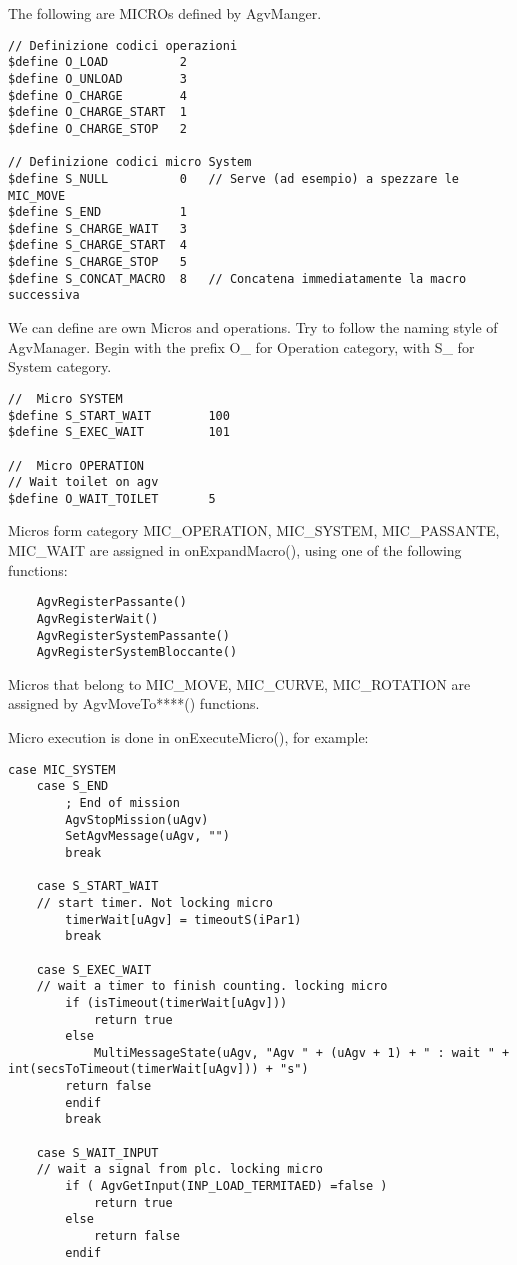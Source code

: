 The following are MICROs defined by AgvManger.

\begin{lstlisting}[caption= MICRO and OPERAIONS defined by AgvManager]
// Definizione codici operazioni
$define O_LOAD          2
$define O_UNLOAD        3
$define O_CHARGE        4
$define O_CHARGE_START  1
$define O_CHARGE_STOP   2

// Definizione codici micro System
$define S_NULL          0	// Serve (ad esempio) a spezzare le MIC_MOVE
$define S_END           1
$define S_CHARGE_WAIT   3
$define S_CHARGE_START  4
$define S_CHARGE_STOP   5
$define S_CONCAT_MACRO  8	// Concatena immediatamente la macro successiva
\end{lstlisting}

We can define are own Micros and operations. Try to follow the naming style of AgvManager. Begin with the prefix O\_ for Operation category, with S\_ for System category.

\begin{lstlisting}[caption= MICRO and OPERAIONS defined by user]
//	Micro SYSTEM
$define S_START_WAIT		100
$define S_EXEC_WAIT			101

//	Micro OPERATION
// Wait toilet on agv
$define O_WAIT_TOILET		5
\end{lstlisting}

Micros form category MIC\_OPERATION, MIC\_SYSTEM, MIC\_PASSANTE, MIC\_WAIT are assigned in onExpandMacro(), using one of the following functions:
\begin{lstlisting}
	AgvRegisterPassante()
	AgvRegisterWait()
	AgvRegisterSystemPassante()
	AgvRegisterSystemBloccante()
\end{lstlisting}

Micros that belong to MIC\_MOVE, MIC\_CURVE, MIC\_ROTATION are assigned by AgvMoveTo****() functions.

Micro execution is done in onExecuteMicro(), for example:

\begin{lstlisting}
case MIC_SYSTEM
	case S_END
		; End of mission
		AgvStopMission(uAgv)
		SetAgvMessage(uAgv, "")
		break
		
	case S_START_WAIT
	// start timer. Not locking micro
		timerWait[uAgv] = timeoutS(iPar1)
		break
	
	case S_EXEC_WAIT
	// wait a timer to finish counting. locking micro
		if (isTimeout(timerWait[uAgv]))
			return true
		else
			MultiMessageState(uAgv, "Agv " + (uAgv + 1) + " : wait " + int(secsToTimeout(timerWait[uAgv])) + "s")
		return false
		endif
		break
	
	case S_WAIT_INPUT
	// wait a signal from plc. locking micro
		if ( AgvGetInput(INP_LOAD_TERMITAED) =false )
			return true
		else
			return false
		endif

\end{lstlisting}

